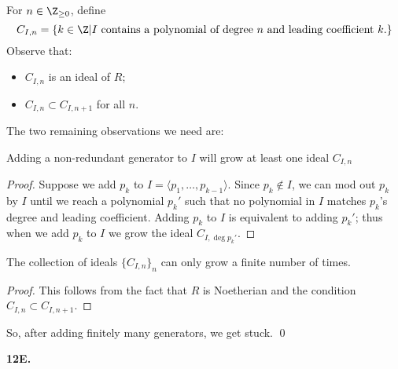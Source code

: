 For $n\in \Z_{\ge 0}$, define 
\[C_{I,n} = \{k\in \Z | I\text{ contains a polynomial of degree }n\text{ and leading coefficient }k.\}\]
Observe that:
\begin{itemize}
\item $C_{I,n}$ is an ideal of $R$; 
\item $C_{I,n}\subset C_{I,n+1}$ for all $n$.  
\end{itemize}
The two remaining observations we need are: 
\begin{prop}
Adding a non-redundant generator to $I$ will grow at least one ideal $C_{I,n}$\end{prop}
\begin{proof}
Suppose we add $p_k$ to $I=\langle p_1,\dots,p_{k-1}\rangle$.  Since $p_k\not\in I$, we can mod out $p_k$ by $I$ until we reach a polynomial $p_k'$ such that no polynomial in $I$ matches $p_k$'s degree and leading coefficient.  Adding $p_k$ to $I$ is equivalent to adding $p_k'$; thus when we add $p_k$ to $I$ we grow the ideal $C_{I,\deg p_k'}$.  
\end{proof}
\begin{prop}
The collection of ideals $\{C_{I,n}\}_n$ can only grow a finite number of times.  
\end{prop}
\begin{proof}
This follows from the fact that $R$ is Noetherian and the condition $C_{I,n}\subset C_{I,n+1}$.  
\end{proof}

So, after adding finitely many generators, we get stuck.  \qed


\textbf{12E.}

